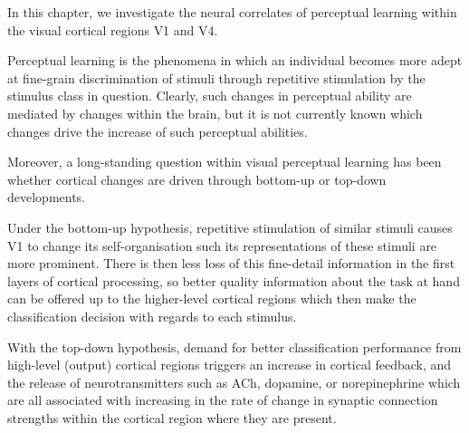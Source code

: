 In this chapter, we investigate the neural correlates of perceptual learning within the visual cortical regions \ac{V1} and \ac{V4}.

Perceptual learning is the phenomena in which an individual becomes more adept at fine-grain discrimination of stimuli through repetitive stimulation by the stimulus class in question.
Clearly, such changes in perceptual ability are mediated by changes within the brain, but it is not currently known which changes drive the increase of such perceptual abilities.

Moreover, a long-standing question within visual perceptual learning has been whether cortical changes are driven through bottom-up or top-down developments.

Under the bottom-up hypothesis, repetitive stimulation of similar stimuli causes \ac{V1} to change its self-organisation such its representations of these stimuli are more prominent.
There is then less loss of this fine-detail information in the first layers of cortical processing, so better quality information about the task at hand can be offered up to the higher-level cortical regions which then make the classification decision with regards to each stimulus.

With the top-down hypothesis, demand for better classification performance from high-level (output) cortical regions triggers an increase in cortical feedback, and the release of neurotransmitters such as \ac{ACh}, dopamine, or norepinephrine which are all associated with increasing in the rate of change in synaptic connection strengths within the cortical region where they are present.

